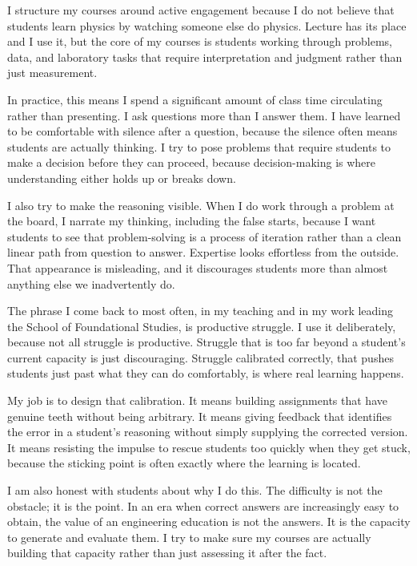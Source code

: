 \documentclass[10pt]{article}
\begin{document}

I structure my courses around active engagement because I do not believe that students learn
physics by watching someone else do physics. Lecture has its place and I use it, but the core
of my courses is students working through problems, data, and laboratory tasks that require
interpretation and judgment rather than just measurement.

In practice, this means I spend a significant amount of class time circulating rather than
presenting. I ask questions more than I answer them. I have learned to be comfortable with
silence after a question, because the silence often means students are actually thinking. I
try to pose problems that require students to make a decision before they can proceed,
because decision-making is where understanding either holds up or breaks down.

I also try to make the reasoning visible. When I do work through a problem at the board, I
narrate my thinking, including the false starts, because I want students to see that
problem-solving is a process of iteration rather than a clean linear path from question to
answer. Expertise looks effortless from the outside. That appearance is misleading, and it
discourages students more than almost anything else we inadvertently do.


The phrase I come back to most often, in my teaching and in my work leading the School of
Foundational Studies, is productive struggle. I use it deliberately, because not all struggle
is productive. Struggle that is too far beyond a student's current capacity is just
discouraging. Struggle calibrated correctly, that pushes students just past what they can do
comfortably, is where real learning happens.

My job is to design that calibration. It means building assignments that have genuine teeth
without being arbitrary. It means giving feedback that identifies the error in a student's
reasoning without simply supplying the corrected version. It means resisting the impulse to
rescue students too quickly when they get stuck, because the sticking point is often exactly
where the learning is located.

I am also honest with students about why I do this. The difficulty is not the obstacle; it is
the point. In an era when correct answers are increasingly easy to obtain, the value of an
engineering education is not the answers. It is the capacity to generate and evaluate them. I
try to make sure my courses are actually building that capacity rather than just assessing it
after the fact.
\end{document}
